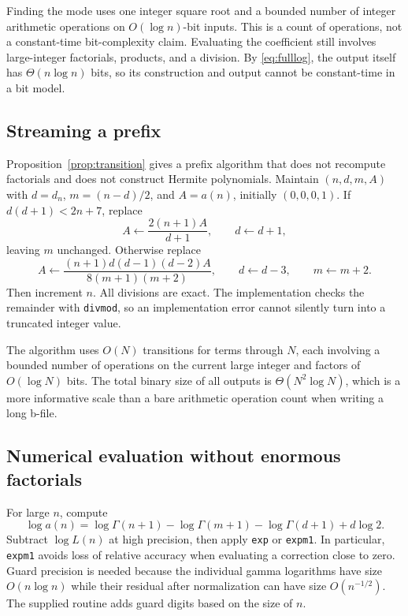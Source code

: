 \documentclass[11pt,letterpaper]{article}
\theoremstyle{remark}
\begin{document}
Finding the mode uses one integer square root and a bounded number of
integer arithmetic operations on $O(\log n)$-bit inputs. This is a count
of operations, not a constant-time bit-complexity claim. Evaluating the
coefficient still involves large-integer factorials, products, and a division.
By \eqref{eq:fulllog}, the output itself has $\Theta(n\log n)$ bits, so its
construction and output cannot be constant-time in a bit model.

\subsection{Streaming a prefix}

Proposition~\ref{prop:transition} gives a prefix algorithm that does not
recompute factorials and does not construct Hermite polynomials. Maintain
$(n,d,m,A)$ with $d=d_n$, $m=(n-d)/2$, and $A=a(n)$, initially
$(0,0,0,1)$. If $d(d+1)<2n+7$, replace
\[
 A\leftarrow\frac{2(n+1)A}{d+1},\qquad d\leftarrow d+1,
\]
leaving $m$ unchanged. Otherwise replace
\[
 A\leftarrow\frac{(n+1)d(d-1)(d-2)A}{8(m+1)(m+2)},\qquad
 d\leftarrow d-3,\qquad m\leftarrow m+2.
\]
Then increment $n$. All divisions are exact. The implementation checks the
remainder with \texttt{divmod}, so an implementation error cannot silently
turn into a truncated integer value.

The algorithm uses $O(N)$ transitions for terms through $N$, each involving
a bounded number of operations on the current large integer and factors
of $O(\log N)$ bits. The total binary size of all outputs is
$\Theta(N^2\log N)$, which is a more informative scale than a bare arithmetic
operation count when writing a long b-file.

\subsection{Numerical evaluation without enormous factorials}

For large $n$, compute
\begin{equation}\label{eq:logcompute}
 \log a(n)=\log\Gamma(n+1)-\log\Gamma(m+1)-\log\Gamma(d+1)+d\log2.
\end{equation}
Subtract $\log L(n)$ at high precision, then apply \texttt{exp} or
\texttt{expm1}. In particular, \texttt{expm1} avoids loss of relative
accuracy when evaluating a correction close to zero. Guard precision is
needed because the individual gamma logarithms have size $O(n\log n)$
while their residual after normalization can have size $O(n^{-1/2})$.
The supplied routine adds guard digits based on the size of $n$.
\end{document}
